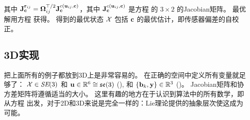 %
其中 ${{\bf J}^{{\bf r}_{ij}}_{{\bf c}}} = {\bm \Omega}_{ij}^{\top/2}{{\bf J}^{c({\bf u}_{ij} , {\bf c})}_{{\bf c}}}$，其中 ${{\bf J}^{c({\bf u}_{ij} , {\bf c})}_{{\bf c}}}$ 是方程  的 $3\times 2$ 的Jacobian矩阵。
最优解用方程  获得。
得到的最优状态 $\mathcal{X}$ 包括 ${\bf c}$ 的最优估计，即传感器偏差的自校正。

\subsection{3D实现}
\label{sec:demos_3D}

把上面所有的例子都放到3D上是非常容易的。
在正确的空间中定义所有变量就足够了：
$\mathcal{X}\in\textit{SE}(3)$ 和 ${\bf u}\in{\mathbb R}^6\cong{\mathfrak {se}}(3)$ (), 和 $\{{\bf b}_k,{\bf y}\}\in{\mathbb R}^3$ ()。
Jacobian矩阵和协方差矩阵将遵循适当的大小。
%
这里有趣的地方在于认识到算法中的所有数学，即从方程  出发，对于2D和3D来说是完全一样的：Lie理论提供的抽象层次使这成为可能。


